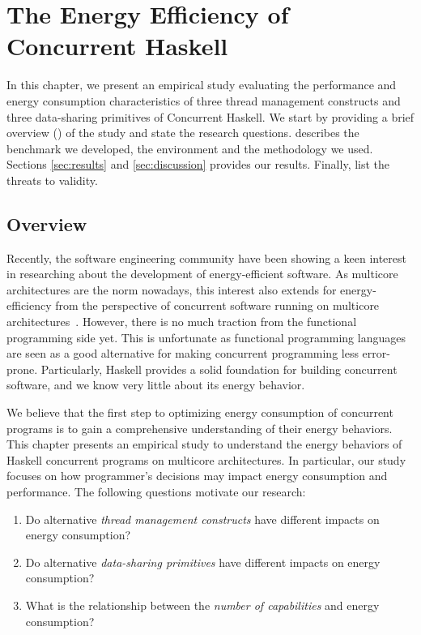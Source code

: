 \chapter{The Energy Efficiency of Concurrent Haskell}
In this chapter, we present an empirical study evaluating the performance and energy consumption characteristics of three thread management constructs and three data-sharing primitives of Concurrent Haskell. We start by providing a brief overview () of the study and state the research questions.  describes the benchmark we developed, the environment and the methodology we used. Sections \ref{sec:results} and \ref{sec:discussion} provides our results. Finally,  list the threats to validity.

\section{Overview}\label{sec:overview}
Recently, the software engineering community have been showing a keen interest in researching about the development of energy-efficient software. As multicore architectures are the norm nowadays, this interest also extends for energy-efficiency from the perspective of concurrent software running on multicore architectures~\cite{trefethen:2013,ribic:2014, pinto:2014}. However, there is no much traction from the functional programming side yet. This is unfortunate as functional programming languages are seen as a good alternative for making concurrent programming less error-prone. %
Particularly, Haskell provides a solid foundation for building concurrent software, and we know very little about its energy behavior.

We believe that the first step to optimizing energy consumption of concurrent programs is to gain a comprehensive understanding of their energy behaviors. This chapter presents an empirical study to understand the energy behaviors of Haskell concurrent programs on multicore architectures. In particular, our study focuses on how programmer's decisions may impact energy consumption and performance. The following questions motivate our research:

\begin{enumerate}[label=\RQ{\arabic*}.]
  \item Do alternative \textit{thread management constructs} have different impacts on energy consumption?
  \item Do alternative \textit{data-sharing primitives} have different impacts on energy consumption?
  \item What is the relationship between the \textit{number of capabilities} and energy consumption?
\end{enumerate}

